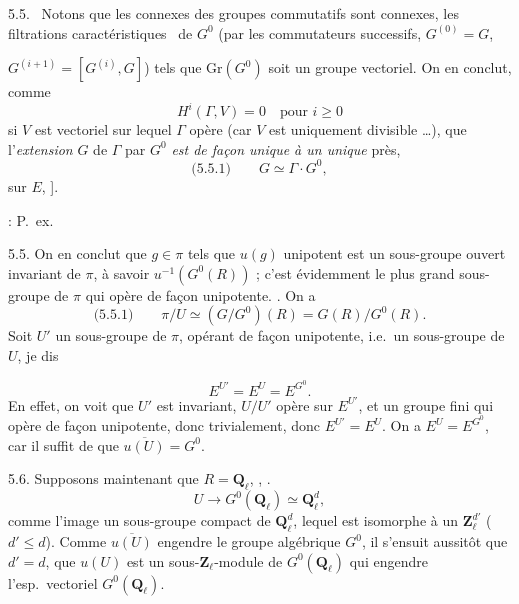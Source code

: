 \documentclass[11pt,a4paper]{article}
\begin{document}
5.5.\ \struck{\ill{}} Notons que \struck{\ill{}} les  connexes des groupes   commutatifs  sont connexes,  les filtrations \og caractéristiques \fg\ de $G^{0}$ (par les commutateurs successifs, $G^{(0)} = G$,

$G^{(i+1)} = [G^{(i)}, G]$) tels que $\mathrm{Gr}(G^{0})$ soit un groupe vectoriel. On en conclut, comme
\[ H^{i}(\Gamma, V) = 0 \quad \text{pour } i \geq 0 \]
si $V$ est vectoriel sur lequel $\Gamma$ opère (car $V$ est uniquement divisible …), que l'\emph{extension} $G$ de $\Gamma$ par $G^{0}$ \emph{est  de façon unique à un unique} \ill{} près,  
\[ \text{(5.5.1)} \qquad G \simeq \Gamma \cdot G^{0} , \]
 \struck{\ill{}}  sur $E$,  ].
\ill{}

 :  \quad P.\ ex.

5.5. On en conclut que   $g \in \pi$ tels que $u(g)$  unipotent est un sous-groupe ouvert invariant de $\pi$, à savoir $u^{-1}(G^{0}(R))$ ; c'est évidemment le plus grand sous-groupe  \struck{\ill{}} de $\pi$ qui opère de façon unipotente. . On a
\[ \text{(5.5.1)} \qquad \pi/U \simeq (G/G^{0})(R) = G(R)/G^{0}(R) . \]
Soit $U'$ un sous-groupe  \struck{\ill{}} de $\pi$, \struck{\ill{}} opérant de façon unipotente, i.e.\ un sous-groupe  de $U$, je dis

\[ E^{U'} = E^{U} = E^{G^{0}} . \]
En effet, on voit  que $U'$ est invariant,  $U/U'$ opère sur $E^{U'}$, et \struck{\ill{}}  un groupe fini qui opère de façon unipotente, donc trivialement, donc $E^{U'} = E^{U}$. On a $E^{U} = E^{G^{0}}$, car il suffit de \ill{} que $\overline{u(U)} = G^{0}$.

5.6. Supposons maintenant que $R = \mathbf{Q}_{\ell}$,  , . 
\[ U \longrightarrow G^{0}(\mathbf{Q}_{\ell}) \simeq \mathbf{Q}_{\ell}^{d} , \]
comme l'image un sous-groupe compact de $\mathbf{Q}_{\ell}^{d}$, lequel est  isomorphe à un $\mathbf{Z}_{\ell}^{d'}$ ($d' \leq d$). Comme \struck{\ill{}} $\overline{u(U)}$ engendre le groupe algébrique $G^{0}$, il s'ensuit aussitôt que $d' = d$,  que $u(U)$ est un sous-$\mathbf{Z}_{\ell}$-module de $G^{0}(\mathbf{Q}_{\ell})$ qui engendre l'esp.\ vectoriel $G^{0}(\mathbf{Q}_{\ell})$.
\end{document}
